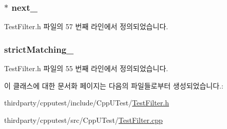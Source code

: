 \subsubsection[{\texorpdfstring{next\+\_\+}{next_}}]{$\ast$ next\+\_\+\hspace{0.3cm}{\ttfamily [private]}}\hypertarget{class_test_filter_aad01155dc538cbbdda086cc87a062de3}{}\label{class_test_filter_aad01155dc538cbbdda086cc87a062de3}


Test\+Filter.\+h 파일의 57 번째 라인에서 정의되었습니다.

\subsubsection[{\texorpdfstring{strict\+Matching\+\_\+}{strictMatching_}}]{ strict\+Matching\+\_\+\hspace{0.3cm}{\ttfamily [private]}}\hypertarget{class_test_filter_a3eb4bdf5edaca52170508c57986e1b36}{}\label{class_test_filter_a3eb4bdf5edaca52170508c57986e1b36}


Test\+Filter.\+h 파일의 55 번째 라인에서 정의되었습니다.



이 클래스에 대한 문서화 페이지는 다음의 파일들로부터 생성되었습니다.\+:\begin{DoxyCompactItemize}
\item 
thirdparty/cpputest/include/\+Cpp\+U\+Test/\hyperlink{_test_filter_8h}{Test\+Filter.\+h}\item 
thirdparty/cpputest/src/\+Cpp\+U\+Test/\hyperlink{_test_filter_8cpp}{Test\+Filter.\+cpp}\end{DoxyCompactItemize}
